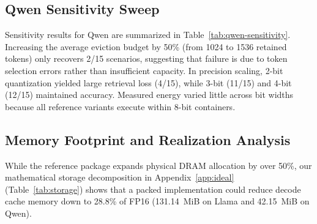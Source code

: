 \documentclass[sigconf,nonacm]{acmart}
\begin{document}
\subsection{Qwen Sensitivity Sweep}

Sensitivity results for Qwen are summarized in Table~\ref{tab:qwen-sensitivity}. Increasing the average eviction budget by 50\% (from 1024 to 1536 retained tokens) only recovers 2/15 scenarios, suggesting that failure is due to token selection errors rather than insufficient capacity. In precision scaling, 2-bit quantization yielded large retrieval loss (4/15), while 3-bit (11/15) and 4-bit (12/15) maintained accuracy. Measured energy varied little across bit widths because all reference variants execute within 8-bit containers.

\begin{table}[htbp]
\caption{Qwen Sensitivity at 4096 Tokens (15 Common Scenarios)}
\label{tab:qwen-sensitivity}
\centering\small
{}
\end{table}

\subsection{Memory Footprint and Realization Analysis}

While the reference package expands physical DRAM allocation by over 50\%, our mathematical storage decomposition in Appendix~\ref{app:ideal} (Table~\ref{tab:storage}) shows that a packed implementation could reduce decode cache memory down to 28.8\% of FP16 (131.14~MiB on Llama and 42.15~MiB on Qwen).
\end{document}
